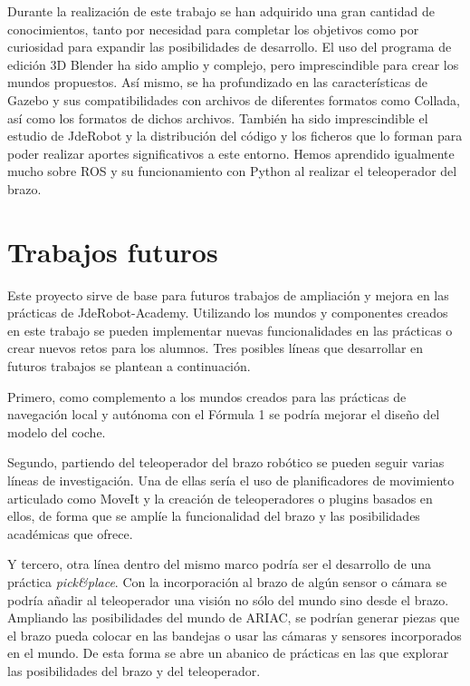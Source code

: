 Durante la realización de este trabajo se han adquirido una gran cantidad de conocimientos, tanto por necesidad para completar los objetivos como por curiosidad para expandir las posibilidades de desarrollo. El uso del programa de edición 3D Blender ha sido amplio y complejo, pero imprescindible para crear los mundos propuestos. Así mismo, se ha profundizado en las características de Gazebo y sus compatibilidades con archivos de diferentes formatos como Collada, así como los formatos de dichos archivos. También ha sido imprescindible el estudio de JdeRobot y la distribución del código y los ficheros que lo forman para poder realizar aportes significativos a este entorno. Hemos aprendido igualmente mucho sobre ROS y su funcionamiento con Python al realizar el teleoperador del brazo.


\section{Trabajos futuros}
\label{sec:cn_trabajosfuturos}

Este proyecto sirve de base para futuros trabajos de ampliación y mejora en las prácticas de JdeRobot-Academy. Utilizando los mundos y componentes creados en este trabajo se pueden implementar nuevas funcionalidades en las prácticas o crear nuevos retos para los alumnos. Tres posibles líneas que desarrollar en futuros trabajos se plantean a continuación.

Primero, como complemento a los mundos creados para las prácticas de navegación local y autónoma con el Fórmula 1 se podría mejorar el diseño del modelo del coche. 

Segundo, partiendo del teleoperador del brazo robótico se pueden seguir varias líneas de investigación. Una de ellas sería el uso de planificadores de movimiento articulado como MoveIt y la creación de teleoperadores o plugins basados en ellos, de forma que se amplíe la funcionalidad del brazo y las posibilidades académicas que ofrece. 

Y tercero, otra línea dentro del mismo marco podría ser el desarrollo de una práctica \textit{pick\&place}. Con la incorporación al brazo de algún sensor o cámara se podría añadir al teleoperador una visión no sólo del mundo sino desde el brazo. Ampliando las posibilidades del mundo de ARIAC, se podrían generar piezas que el brazo pueda colocar en las bandejas o usar las cámaras y sensores incorporados en el mundo. De esta forma se abre un abanico de prácticas en las que explorar las posibilidades del brazo y del teleoperador.




